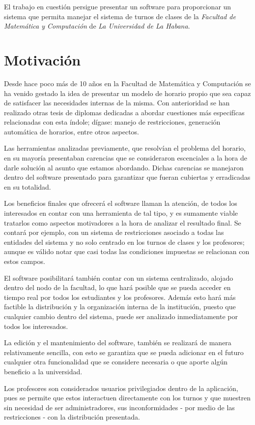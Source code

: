 El trabajo en cuestión persigue presentar un software para proporcionar un sistema que permita manejar el sistema de turnos de clases de la \textit{Facultad de Matemática y Computación} de \textit{La Universidad de La Habana}.
	
\section{Motivación}
Desde hace poco más de 10 años en la Facultad de Matemática y Computación se ha venido gestado la idea de presentar un modelo de horario propio que sea capaz de satisfacer las necesidades internas de la misma. Con anterioridad se han realizado otras tesis de diplomas dedicadas a abordar cuestiones más especifícas relacionadas con esta índole; dígase: manejo de restricciones, generación automática de horarios, entre otros aspectos. 
	
Las herramientas analizadas previamente, que resolvían el problema del horario, en su mayoría presentaban carencias que se consideraron escenciales a la hora de darle solución al asunto que estamos abordando. Dichas carencias se manejaron dentro del software presentado para garantizar que fueran cubiertas y erradicadas en su totalidad.
	
Los beneficios finales que ofrecerá el software llaman la atención, de todos los interesados en contar con una herramienta de tal tipo, y es sumamente viable tratarlos como aspectos motivadores a la hora de analizar el resultado final. Se contará por ejemplo, con un sistema de restricciones asociado a todas las entidades del sistema y no solo centrado en los turnos de clases y los profesores; aunque es válido notar que casi todas las condiciones impuestas se relacionan con estos campos. 
	
El software posibilitará también contar con un sistema centralizado, alojado dentro del nodo de la facultad, lo que hará posible que se pueda acceder en tiempo real por todos los estudiantes y los profesores. Además esto hará más factible la distribución y la organización interna de la institución, puesto que cualquier cambio dentro del sistema, puede ser analizado inmediatamente por todos los interesados.
	
La edición y el mantenimiento del software, también se realizará de manera relativamente sencilla, con esto se garantiza que se pueda adicionar en el futuro cualquier otra funcionalidad que se considere necesaria o que aporte algún beneficio a la universidad. 
	
Los profesores son considerados usuarios privilegiados dentro de la aplicación, pues se permite que estos interactuen directamente con los turnos y que muestren sin necesidad de ser administradores, sus inconformidades - por medio de las restricciones -  con la distribución presentada.
	
